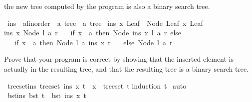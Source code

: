 \begin{isabellebody}
\begin{isamarkuptext}
      the new tree computed by the program is also a binary search tree.%
\end{isamarkuptext}\isamarkuptrue%
\isamarkupfalse%
\ ins\ {\isacharcolon}{\kern0pt}{\isacharcolon}{\kern0pt}\ {\isachardoublequoteopen}{\isacharprime}{\kern0pt}a{\isacharcolon}{\kern0pt}{\isacharcolon}{\kern0pt}linorder\ {\isasymRightarrow}\ {\isacharprime}{\kern0pt}a\ tree\ {\isasymRightarrow}\ {\isacharprime}{\kern0pt}a\ tree{\isachardoublequoteclose}\ \isanewline
\isanewline
{\isachardoublequoteopen}ins\ x\ Leaf\ {\isacharequal}{\kern0pt}\ Node\ Leaf\ x\ Leaf{\isachardoublequoteclose}\ {\isacharbar}{\kern0pt}\isanewline
{\isachardoublequoteopen}ins\ x\ {\isacharparenleft}{\kern0pt}Node\ l\ a\ r{\isacharparenright}{\kern0pt}\ {\isacharequal}{\kern0pt}\isanewline
\ \ {\isacharparenleft}{\kern0pt}if\ x\ {\isacharless}{\kern0pt}\ a\ then\ Node\ {\isacharparenleft}{\kern0pt}ins\ x\ l{\isacharparenright}{\kern0pt}\ a\ r\ else\isanewline
\ \ \ if\ x\ {\isachargreater}{\kern0pt}\ a\ then\ Node\ l\ a\ {\isacharparenleft}{\kern0pt}ins\ x\ r{\isacharparenright}{\kern0pt}\isanewline
\ \ \ else\ Node\ l\ a\ r{\isacharparenright}{\kern0pt}{\isachardoublequoteclose}%
\begin{isamarkuptext}%
Prove that your program is correct by showing that the inserted element is actually in the 
      resulting tree, and that the resulting tree is a binary search tree.%
\end{isamarkuptext}\isamarkuptrue%
\isamarkupfalse%
\ tree{\isacharunderscore}{\kern0pt}set{\isacharunderscore}{\kern0pt}ins{\isacharcolon}{\kern0pt}\ {\isachardoublequoteopen}tree{\isacharunderscore}{\kern0pt}set\ {\isacharparenleft}{\kern0pt}ins\ x\ t{\isacharparenright}{\kern0pt}\ {\isacharequal}{\kern0pt}\ {\isacharbraceleft}{\kern0pt}x{\isacharbraceright}{\kern0pt}\ {\isasymunion}\ tree{\isacharunderscore}{\kern0pt}set\ t{\isachardoublequoteclose}\isanewline
%
\isadelimproof
\isanewline
%
\endisadelimproof
%
\isatagproof
{}\isamarkupfalse%
{\isacharparenleft}{\kern0pt}induction\ t{\isacharparenright}{\kern0pt}\isanewline
{}\isamarkupfalse%
\ auto\isanewline
{}\isamarkupfalse%
%
\endisatagproof
{\isafoldproof}%
%
\isadelimproof
\isanewline
%
\endisadelimproof
\isanewline
\isanewline
{}\isamarkupfalse%
\ bst{\isacharunderscore}{\kern0pt}ins{\isacharcolon}{\kern0pt}\ {\isachardoublequoteopen}bst\ t\ {\isasymLongrightarrow}\ bst\ {\isacharparenleft}{\kern0pt}ins\ x\ t{\isacharparenright}{\kern0pt}{\isachardoublequoteclose}\isanewline

\end{isabellebody}
